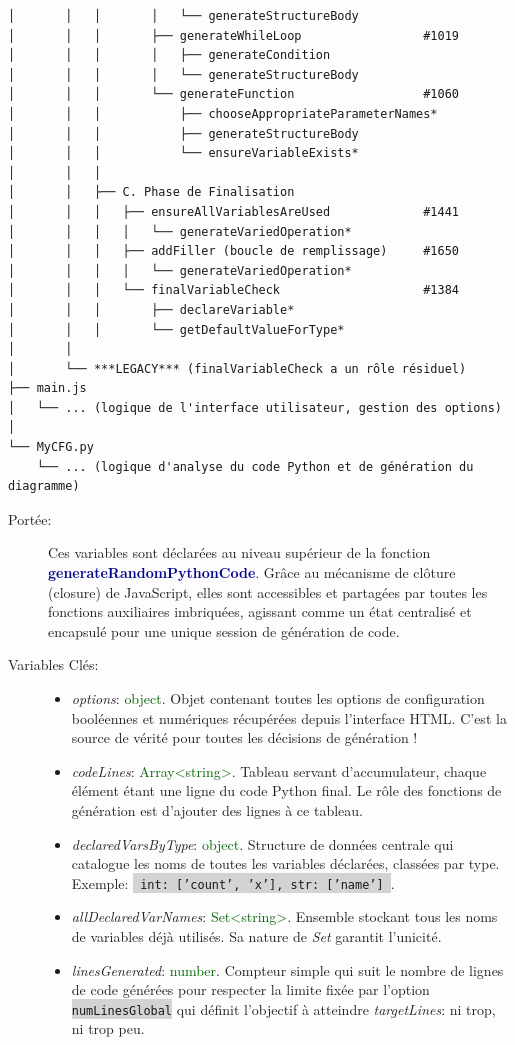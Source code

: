 \documentclass[11pt,a4paper]{article}
\newcommand{\code}[1]{\colorbox{lightgray}{\texttt{\small #1}}}
\newcommand{\var}[1]{\textit{#1}}
\newcommand{\vartype}[1]{\textcolor{darkgreen}{#1}}
\newcommand{\methodname}[1]{\textbf{\textcolor{darkblue}{#1}}}
\newcommand{\param}[1]{\code{#1}}
\begin{document}
\begin{verbatim}
│       │   │       │   └── generateStructureBody
│       │   │       ├── generateWhileLoop                 #1019
│       │   │       │   ├── generateCondition
│       │   │       │   └── generateStructureBody
│       │   │       └── generateFunction                  #1060
│       │   │           ├── chooseAppropriateParameterNames*
│       │   │           ├── generateStructureBody
│       │   │           └── ensureVariableExists*
│       │   │
│       │   ├── C. Phase de Finalisation
│       │   │   ├── ensureAllVariablesAreUsed             #1441
│       │   │   │   └── generateVariedOperation*
│       │   │   ├── addFiller (boucle de remplissage)     #1650
│       │   │   │   └── generateVariedOperation*
│       │   │   └── finalVariableCheck                    #1384
│       │   │       ├── declareVariable*
│       │   │       └── getDefaultValueForType*
│       │
│       └── ***LEGACY*** (finalVariableCheck a un rôle résiduel)
├── main.js
│   └── ... (logique de l'interface utilisateur, gestion des options)
│
└── MyCFG.py
    └── ... (logique d'analyse du code Python et de génération du diagramme)
\end{verbatim}

\begin{description}
\item[Portée:] Ces variables sont déclarées au niveau supérieur de la fonction \methodname{generateRandomPythonCode}. Grâce au mécanisme de clôture (closure) de JavaScript, elles sont accessibles et partagées par toutes les fonctions auxiliaires imbriquées, agissant comme un état centralisé et encapsulé pour une unique session de génération de code.
\item[Variables Clés:]
\begin{itemize}
\item \var{options}: \vartype{object}. Objet contenant toutes les options de configuration booléennes et numériques récupérées depuis l'interface HTML. C'est la source de vérité pour toutes les décisions de génération !
\item \var{codeLines}: \vartype{Array<string>}. Tableau servant d'accumulateur, chaque élément étant une ligne du code Python final. Le rôle des fonctions de génération est d'ajouter des lignes à ce tableau.
\item \var{declaredVarsByType}: \vartype{object}. Structure de données centrale qui catalogue les noms de toutes les variables déclarées, classées par type. Exemple: \code{{ int: ['count', 'x'], str: ['name'] }}.
\item \var{allDeclaredVarNames}: \vartype{Set<string>}. Ensemble stockant tous les noms de variables déjà utilisés. Sa nature de \textit{Set} garantit l'unicité.
\item \var{linesGenerated}: \vartype{number}. Compteur simple qui suit le nombre de lignes de code générées pour respecter la limite fixée par l'option \param{numLinesGlobal} qui définit l'objectif à atteindre \var{targetLines}: ni trop, ni trop peu.
\end{itemize}
\end{description}
\end{document}
